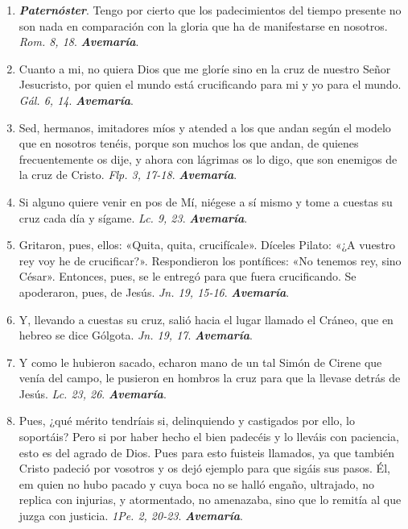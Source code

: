 \documentclass[./rosary.tex]{subfiles}
\begin{document}
\begin{enumerate}
      \item \textbf{\emph{Paternóster}}. Tengo por cierto que los padecimientos del tiempo presente no son nada en comparación con la gloria que ha
            de manifestarse en nosotros. \emph{Rom. 8, 18}. \textbf{\emph{Avemaría}}.

      \item Cuanto a mi, no quiera Dios que me gloríe sino en la cruz de nuestro Señor Jesucristo, por quien el mundo está crucificando
            para mi y yo para el mundo. \emph{Gál. 6, 14}. \textbf{\emph{Avemaría}}.

      \item Sed, hermanos, imitadores míos y atended a los que andan según el modelo que en nosotros tenéis, porque son muchos los que andan, de quienes frecuentemente
            os dije, y ahora con lágrimas os lo digo, que son enemigos de la cruz de Cristo. \emph{Flp. 3, 17-18}. \textbf{\emph{Avemaría}}.

      \item Si alguno quiere venir en pos de Mí, niégese a sí mismo y tome a cuestas su cruz cada día y sígame. \emph{Lc. 9, 23}. \textbf{\emph{Avemaría}}.

      \item Gritaron, pues, ellos: «Quita, quita, crucifícale». Díceles Pilato: «¿A vuestro rey voy he de crucificar?».
            Respondieron los pontífices: «No tenemos rey, sino César». Entonces, pues, se le entregó para que fuera crucificando.
            Se apoderaron, pues, de Jesús. \emph{Jn. 19, 15-16}. \textbf{\emph{Avemaría}}.

      \item Y, llevando a cuestas su cruz, salió hacia el lugar llamado el Cráneo, que en hebreo se dice Gólgota. \emph{Jn. 19, 17}. \textbf{\emph{Avemaría}}.

      \item Y como le hubieron sacado, echaron mano de un tal Simón de Cirene que venía del campo, le pusieron en hombros la cruz para que la llevase detrás de Jesús.
            \emph{Lc. 23, 26}. \textbf{\emph{Avemaría}}.

      \item Pues, ¿qué mérito tendríais si, delinquiendo y castigados por ello, lo soportáis? Pero si por haber hecho el bien padecéis y lo lleváis con paciencia,
            esto es del agrado de Dios. Pues para esto fuisteis llamados, ya que también Cristo padeció por vosotros y os dejó ejemplo para que sigáis sus pasos. Él,
            em quien no hubo pacado y cuya boca no se halló engaño, ultrajado, no replica con injurias, y atormentado, no amenazaba, sino que lo remitía al que juzga
            con justicia. \emph{1Pe. 2, 20-23}. \textbf{\emph{Avemaría}}.


\end{enumerate}
\end{document}
